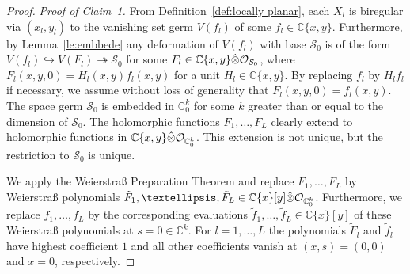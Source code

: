 \documentclass[11pt,twoside]{amsart}
\theoremstyle{plain}
\newcommand{\C}{\mathbb{C}}
\newcommand{\Sm}{\mathcal{S}}
\newcommand{\Sh}[1]{\mathcal{#1}} %
\begin{document}
\begin{proof}
\emph{Proof of Claim~1.}
From Definition~\ref{def:locally planar}, each $X_l$ is biregular via $(x_l,y_l)$ to the vanishing set germ $V(f_l)$ of some $f_l\in\C\{x, y\}$. Furthermore, by Lemma~\ref{le:embbede} any deformation of $V(f_l)$ with base $\Sm_0$ is of the form $V(f_l)\hookrightarrow V(F_l)\twoheadrightarrow\Sm_0$ for some $F_l\in\mathbb{C}\{x,y\}\Hat{\otimes}\Sh{O}_{\Sm_0}$, where $F_l(x, y,0)=H_l(x, y)f_l(x, y)$ for a unit $H_l\in\mathbb{C}\{x, y\}$. By replacing $f_l$ by $H_lf_l$ if necessary, we assume without loss of generality that $F_l(x, y,0)=f_l(x, y)$. The space germ $\Sm_0$ is embedded in $\mathbb{C}^k_0$ for some $k$ greater than or equal to the dimension of $\Sm_0$. The holomorphic functions $F_1,\ldots,F_L$ clearly extend to holomorphic functions in $\mathbb{C}\{x,y\}\Hat{\otimes}\Sh{O}_{\mathbb{C}^k_0}$. This extension is not unique, but the restriction to $\Sm_0$ is unique. %

We apply the Weierstra{\ss} Preparation Theorem \cite[Chapter~I Theorem 1.4]{PR:94} and replace $F_1,\ldots,F_L$ by Weierstra{\ss} polynomials $\tilde{F}_1,\ldots,\tilde{F}_L\in\mathbb{C}\{x\}[y]\Hat{\otimes}\Sh{O}_{\mathbb{C}^k_0}$. Furthermore, we replace $f_1,\ldots,f_L$ by the corresponding evaluations $\tilde{f}_1,\ldots,\tilde{f}_L\in\mathbb{C}\{x\}[ y]$ of these Weierstra{\ss} polynomials at $s=0 \in \mathbb{C}^k$. For $l=1,\ldots,L$ the polynomials $\tilde{F}_l$ and $\tilde{f}_l$ have highest coefficient $1$ and all other coefficients vanish at $(x,s)=(0,0)$ and $x=0$, respectively.



\end{proof}
\end{document}
